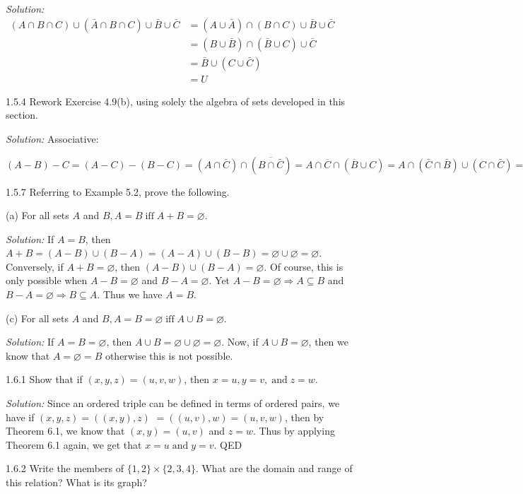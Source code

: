 \documentclass{letter}
\newcommand{\tmop}[1]{\ensuremath{\operatorname{#1}}}
\newcommand{\tmtextit}[1]{{\itshape{#1}}}
\begin{document}
\tmtextit{Solution:} $\begin{array}{ll}
  (A \cap B \cap C) \cup ( \bar{A} \cap B \cap C) \cup \bar{B} \cup \bar{C} &
  = (A \cup \bar{A}) \cap (B \cap C) \cup \bar{B} \cup \bar{C}\\
  & = (B \cup \bar{B}) \cap ( \bar{B} \cup C) \cup \bar{C}\\
  & = \bar{B} \cup (C \cup \bar{C})\\
  & = U
\end{array}$

1.5.4 Rework Exercise 4.9(b), using solely the algebra of sets developed in
this section.

\tmtextit{Solution:} Associative:

$(A - B) - C = (A - C) - (B - C) = (A \cap \bar{C}) \cap ( \overline{B \cap
\bar{C}}) = A \cap \overline{C} \cap ( \overline{B} \cup C) = A \cap ( \bar{C}
\cap \bar{B}) \cup (C \cap \bar{C}) = A \cap ( \bar{C} \cap \bar{B}) \cup
\varnothing = A \cap \bar{B} \cap \bar{C} = (A - B) - C$

1.5.7 Referring to Example 5.2, prove the following.

(a) For all sets $A$ and $B, A = B \tmop{iff} A + B = \varnothing$.

\tmtextit{Solution:} If $A = B$, then $A + B = (A - B) \cup (B - A) = (A - A)
\cup (B - B) = \varnothing \cup \varnothing = \varnothing$. Conversely, if $A
+ B = \varnothing$, then $(A - B) \cup (B - A) = \varnothing$. Of course, this
is only possible when $A - B = \varnothing$ and $B - A = \varnothing$. Yet $A
- B = \varnothing \Rightarrow A \subseteq B$ and $B - A = \varnothing
\Rightarrow B \subseteq A$. Thus we have $A = B$.

(c) For all sets $A$ and $B, A = B = \varnothing \tmop{iff} A \cup B =
\varnothing$.

\tmtextit{Solution:} If $A = B = \varnothing$, then $A \cup B = \varnothing
\cup \varnothing = \varnothing$. Now, if $A \cup B = \varnothing$, then we
know that $A = \varnothing = B$ otherwise this is not possible.

1.6.1 Show that if $(x, y, z) = (u, v, w)$, then $x = u, y = v, \tmop{and} z =
w$.

\tmtextit{Solution:} Since an ordered triple can be defined in terms of
ordered pairs, we have if $(x, y, z) = ((x, y), z)$ $= ((u, v), w) = (u, v,
w)$, then by Theorem 6.1, we know that $(x, y) = (u, v)$ and $z = w$. Thus by
applying Theorem 6.1 again, we get that $x = u \tmop{and} y = v$. QED

1.6.2 Write the members of $\{1, 2\} \times \{2, 3, 4\}$. What are the domain
and range of this relation? What is its graph?
\end{document}
